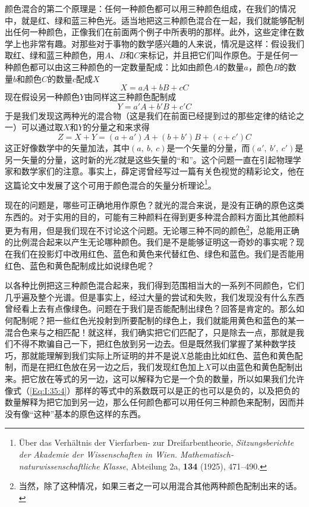 颜色混合的第二个原理是：任何一种颜色都可以用三种颜色组成，在我们的情况中，就是红、绿和蓝三种色光。适当地把这三种颜色混合在一起，我们就能够配制出任何一种颜色，正像我们在前面两个例子中所表明的那样。此外，这些定律在数学上也非常有趣。对那些对于事物的数学感兴趣的人来说，情况是这样：假设我们取红、绿和蓝三种颜色，用$A$、$B$和$C$来标记，并且把它们叫作原色。于是任何一种颜色都可以由这三种颜色的一定数量配成：比如由颜色$A$的数量$a$，颜色$B$的数量$b$和颜色$C$的数量$c$配成$X$
\begin{equation}
    \label{Eq:I:35:4}
    X = aA + bB + cC
\end{equation}
现在假设另一种颜色$Y$由同样这三种颜色配制成
\begin{equation}
    \label{Eq:I:35:5}
    Y = a'A + b'B + c'C
\end{equation}
于是我们发现这两种光的混合物（这是我们在前面已经提到过的那些定律的结论之一）可以通过取$X$和$Y$的分量之和来求得
\begin{equation}
    \label{Eq:I:35:6}
    Z = X + Y = (a + a')A + (b + b')B + (c + c')C
\end{equation}
这正好像数学中的矢量加法，其中$(a,~b,~c)$是一个矢量的分量，而$(a',~b',~c')$是另一矢量的分量，这时新的光$Z$就是这些矢量的“和”。这个问题一直在引起物理学家和数学家们的注意。事实上，薛定谔曾经写过一篇有关色视觉的精彩论文，他在这篇论文中发展了这个可用于颜色混合的矢量分析理论\footnote{Über das Verhältnis der Vierfarben- zur Dreifarbentheorie, \textit{Sitzungsberichte der Akademie der Wissenschaften in Wien. Mathematisch-naturwissenschaftliche Klasse}, Abteilung 2a, \textbf{134} (1925), 471--490.}。

现在的问题是，哪些可正确地用作原色？就光的混合来说，是没有正确的原色这类东西的。对于实用的目的，可能有三种颜料在得到更多种混合颜料方面比其他颜料更为有用，但是我们现在不讨论这个问题。无论哪三种不同的颜色\footnote{当然，除了这种情况，如果三者之一可以用混合其他两种颜色配制出来的话。}，总能用正确的比例混合起来以产生无论哪种颜色。我们是不是能够证明这一奇妙的事实呢？现在我们在投影灯中改用红色、蓝色和黄色来代替红色、绿色和蓝色。我们是否能用红色、蓝色和黄色配制成比如说绿色呢？

以各种比例把这三种颜色混合起来，我们得到范围相当大的一系列不同颜色，它们几乎遍及整个光谱。但是事实上，经过大量的尝试和失败，我们发现没有什么东西曾经看上去有点像绿色。问题在于我们是否能配制出绿色？回答是肯定的。那么如何配制呢？把一些红色光投射到所要配制的绿色上，我们就能用黄色和蓝色的某一混合色来与之相匹配！就这样，我们确实把它们匹配了，只是除去一点，那就是我们不得不欺骗自己一下，把红色放到另一边去。但是既然我们掌握了某种数学技巧，那就能理解到我们实际上所证明的并不是说$X$总能由比如红色、蓝色和黄色配制，而是在把红色放在另一边之后，我们发现红色加上$X$可以由蓝色和黄色配制出来。把它放在等式的另一边，这可以解释为它是一个负的数量，所以如果我们允许像式（\ref{Eq:I:35:4}）那样的等式中的系数既可以是正的也可以是负的，以及把负的数量解释为把它加到另一边，那么任何颜色都可以用任何三种颜色来配制，因而并没有像“这种”基本的原色这样的东西。


